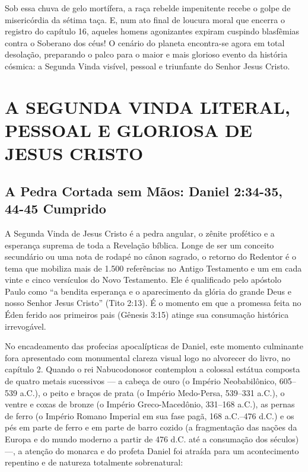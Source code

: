 Sob essa chuva de gelo mortífera, a raça rebelde impenitente recebe o golpe de misericórdia da sétima taça. E, num ato final de loucura moral que encerra o registro do capítulo 16, aqueles homens agonizantes expiram cuspindo blasfêmias contra o Soberano dos céus! O cenário do planeta encontra-se agora em total desolação, preparando o palco para o maior e mais glorioso evento da história cósmica: a Segunda Vinda visível, pessoal e triunfante do Senhor Jesus Cristo.



\section{A SEGUNDA VINDA LITERAL, PESSOAL E GLORIOSA DE JESUS CRISTO}



\subsection{A Pedra Cortada sem Mãos: Daniel 2:34-35, 44-45 Cumprido}


A Segunda Vinda de Jesus Cristo é a pedra angular, o zênite profético e a esperança suprema de toda a Revelação bíblica. Longe de ser um conceito secundário ou uma nota de rodapé no cânon sagrado, o retorno do Redentor é o tema que mobiliza mais de 1.500 referências no Antigo Testamento e um em cada vinte e cinco versículos do Novo Testamento. Ele é qualificado pelo apóstolo Paulo como ``a bendita esperança e o aparecimento da glória do grande Deus e nosso Senhor Jesus Cristo'' (Tito 2:13). É o momento em que a promessa feita no Éden ferido aos primeiros pais (Gênesis 3:15) atinge sua consumação histórica irrevogável.

No encadeamento das profecias apocalípticas de Daniel, este momento culminante fora apresentado com monumental clareza visual logo no alvorecer do livro, no capítulo 2. Quando o rei Nabucodonosor contemplou a colossal estátua composta de quatro metais sucessivos — a cabeça de ouro (o Império Neobabilônico, 605–539 a.C.), o peito e braços de prata (o Império Medo-Persa, 539–331 a.C.), o ventre e coxas de bronze (o Império Greco-Macedônio, 331–168 a.C.), as pernas de ferro (o Império Romano Imperial em sua fase pagã, 168 a.C.–476 d.C.) e os pés em parte de ferro e em parte de barro cozido (a fragmentação das nações da Europa e do mundo moderno a partir de 476 d.C. até a consumação dos séculos) —, a atenção do monarca e do profeta Daniel foi atraída para um acontecimento repentino e de natureza totalmente sobrenatural:

